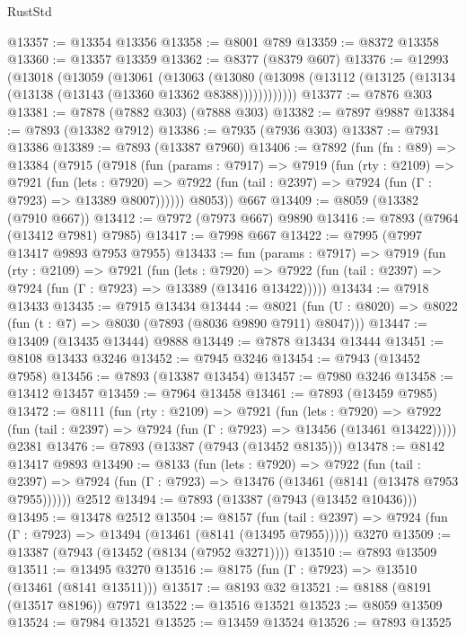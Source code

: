 \begin{lexlean}{RustStd}
\begin{coremodule}
@13357 := @13354 @13356
@13358 := @8001 @789
@13359 := @8372 @13358
@13360 := @13357 @13359
@13362 := @8377 (@8379 @607)
@13376 := @12993
    (@13018
      (@13059
        (@13061
          (@13063
            (@13080 (@13098 (@13112 (@13125 (@13134 (@13138 (@13143 (@13360 @13362 @8388))))))))))))
@13377 := @7876 @303
@13381 := @7878 (@7882 @303) (@7888 @303)
@13382 := @7897 @9887
@13384 := @7893 (@13382 @7912)
@13386 := @7935 (@7936 @303)
@13387 := @7931 @13386
@13389 := @7893 (@13387 @7960)
@13406 := @7892
    (fun (fn : @89) =>
    @13384
      (@7915
        (@7918
          (fun (params : @7917) =>
          @7919
            (fun (rty : @2109) =>
            @7921
              (fun (lets : @7920) =>
              @7922 (fun (tail : @2397) => @7924 (fun (Γ : @7923) => @13389 @8007))))))
        @8053))
    @667
@13409 := @8059 (@13382 (@7910 @667))
@13412 := @7972 (@7973 @667) @9890
@13416 := @7893 (@7964 (@13412 @7981) @7985)
@13417 := @7998 @667
@13422 := @7995 (@7997 @13417 @9893 @7953 @7955)
@13433 := fun (params : @7917) =>
  @7919
    (fun (rty : @2109) =>
    @7921
      (fun (lets : @7920) =>
      @7922 (fun (tail : @2397) => @7924 (fun (Γ : @7923) => @13389 (@13416 @13422)))))
@13434 := @7918 @13433
@13435 := @7915 @13434
@13444 := @8021 (fun (U : @8020) => @8022 (fun (t : @7) => @8030 (@7893 (@8036 @9890 @7911) @8047)))
@13447 := @13409 (@13435 @13444) @9888
@13449 := @7878 @13434 @13444
@13451 := @8108 @13433 @3246
@13452 := @7945 @3246
@13454 := @7943 (@13452 @7958)
@13456 := @7893 (@13387 @13454)
@13457 := @7980 @3246
@13458 := @13412 @13457
@13459 := @7964 @13458
@13461 := @7893 (@13459 @7985)
@13472 := @8111
    (fun (rty : @2109) =>
    @7921
      (fun (lets : @7920) =>
      @7922 (fun (tail : @2397) => @7924 (fun (Γ : @7923) => @13456 (@13461 @13422)))))
    @2381
@13476 := @7893 (@13387 (@7943 (@13452 @8135)))
@13478 := @8142 @13417 @9893
@13490 := @8133
    (fun (lets : @7920) =>
    @7922
      (fun (tail : @2397) =>
      @7924 (fun (Γ : @7923) => @13476 (@13461 (@8141 (@13478 @7953 @7955))))))
    @2512
@13494 := @7893 (@13387 (@7943 (@13452 @10436)))
@13495 := @13478 @2512
@13504 := @8157
    (fun (tail : @2397) => @7924 (fun (Γ : @7923) => @13494 (@13461 (@8141 (@13495 @7955)))))
    @3270
@13509 := @13387 (@7943 (@13452 (@8134 (@7952 @3271))))
@13510 := @7893 @13509
@13511 := @13495 @3270
@13516 := @8175 (fun (Γ : @7923) => @13510 (@13461 (@8141 @13511)))
@13517 := @8193 @32
@13521 := @8188 (@8191 (@13517 @8196)) @7971
@13522 := @13516 @13521
@13523 := @8059 @13509
@13524 := @7984 @13521
@13525 := @13459 @13524
@13526 := @7893 @13525

\end{coremodule}
\end{lexlean}
